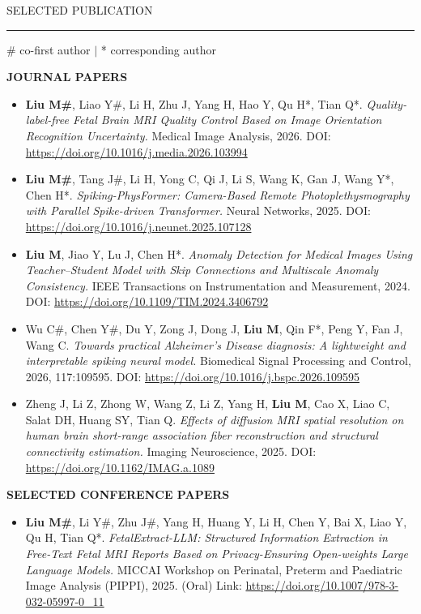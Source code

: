 \documentclass{resume} %
\renewenvironment{rSection}[1]{
\sectionskip
\textcolor{TsinghuaPurple}{\MakeUppercase{#1}}
\sectionlineskip
\hrule
\begin{list}{}{
\setlength{\leftmargin}{0em}
}
\item[]
}{
\end{list}
}
\begin{document}
\begin{rSection}{Selected Publication} %
\# co-first author $|$ * corresponding author

\textbf{JOURNAL PAPERS}

\begin{itemize}
    \item \textbf{Liu M\#}, Liao Y\#, Li H, Zhu J, Yang H, Hao Y, Qu H*, Tian Q*. \textit{Quality-label-free Fetal Brain MRI Quality Control Based on Image Orientation Recognition Uncertainty.} Medical Image Analysis, 2026. DOI: \url{https://doi.org/10.1016/j.media.2026.103994}

    \item \textbf{Liu M\#}, Tang J\#, Li H, Yong C, Qi J, Li S, Wang K, Gan J, Wang Y*,  Chen H*.  \textit{Spiking-PhysFormer: Camera-Based Remote Photoplethysmography with Parallel Spike-driven Transformer.} Neural Networks, 2025. DOI: \url{https://doi.org/10.1016/j.neunet.2025.107128}
 
    \item \textbf{Liu M}, Jiao Y, Lu J, Chen H*. \textit{Anomaly Detection for Medical Images Using Teacher–Student Model with Skip Connections and Multiscale Anomaly Consistency.} IEEE Transactions on Instrumentation and Measurement, 2024. DOI: \url{https://doi.org/10.1109/TIM.2024.3406792} 

    \item Wu C\#, Chen Y\#, Du Y, Zong J, Dong J, \textbf{Liu M}, Qin F*, Peng Y, Fan J, Wang C. \textit{Towards practical Alzheimer’s Disease diagnosis: A lightweight and interpretable spiking neural model.} Biomedical Signal Processing and Control, 2026, 117:109595. DOI: \url{https://doi.org/10.1016/j.bspc.2026.109595}

    \item Zheng J, Li Z, Zhong W, Wang Z, Li Z, Yang H, \textbf{Liu M}, Cao X, Liao C, Salat DH, Huang SY, Tian Q. \textit{Effects of diffusion MRI spatial resolution on human brain short-range association fiber reconstruction and structural connectivity estimation.} Imaging Neuroscience, 2025. DOI: \url{https://doi.org/10.1162/IMAG.a.1089}
\end{itemize}

\textbf{SELECTED CONFERENCE PAPERS}

\begin{itemize}
    \item \textbf{Liu M\#}, Li Y\#, Zhu J\#, Yang H, Huang Y, Li H, Chen Y, Bai X, Liao Y, Qu H, Tian Q*. \textit{FetalExtract-LLM: Structured Information Extraction in Free-Text Fetal MRI Reports Based on Privacy-Ensuring Open-weights Large Language Models.} MICCAI Workshop on Perinatal, Preterm and Paediatric Image Analysis (PIPPI), 2025. (Oral) Link: \url{https://doi.org/10.1007/978-3-032-05997-0_11}


\end{itemize}
\end{rSection}
\end{document}

